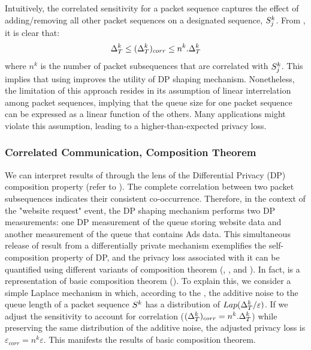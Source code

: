 Intuitively, the correlated sensitivity for a packet sequence captures the effect of adding/removing all other packet sequences on a designated sequence, $S^k_j$.
From , it is clear that:
\begin{equation}
  \Delta_T^k \leq (\Delta_T^k)_{corr} \leq n^k.\Delta_T^k
\end{equation} 
\noindent where $n^k$ is the number of packet subsequences that are correlated with $S^k_j$.
This implies that using  improves the utility of DP shaping mechanism.
Nonetheless, the limitation of this approach resides in its assumption of linear interrelation among packet sequences, implying that the queue size for one packet sequence can be expressed as a linear function of the others.
Many applications might violate this assumption, leading to a higher-than-expected privacy loss.




\subsubsection{Correlated Communication, Composition Theorem}
We can interpret results of  through the lens of the Differential Privacy (DP) composition property (refer to ).
The complete correlation between two packet subsequences indicates their consistent co-occurrence. 
Therefore, in the context of the "website request" event, the DP shaping mechanism performs two DP measurements: one DP measurement of the queue storing website data and another measurement of the queue that contains Ads data.
This simultaneous release of result from a differentially private mechanism exemplifies the self-composition property of DP, and the privacy loss associated with it can be quantified using different variants of composition theorem (, , and ).
In fact,  is a representation of basic composition theorem (). 
To explain this, we consider a simple Laplace mechanism in which, according to the , the additive noise to the queue length of a packet sequence $S^k$ has a distribution of $Lap(\Delta_T^k/\varepsilon)$.
If we adjust the sensitivity to account for correlation (\ie $(\Delta_T^k)_{corr} = n^k.\Delta_T^k$) while preserving the same distribution of the additive noise, the adjusted privacy loss is $\varepsilon_{corr} = n^k \varepsilon$.
This manifests the results of basic composition theorem.

